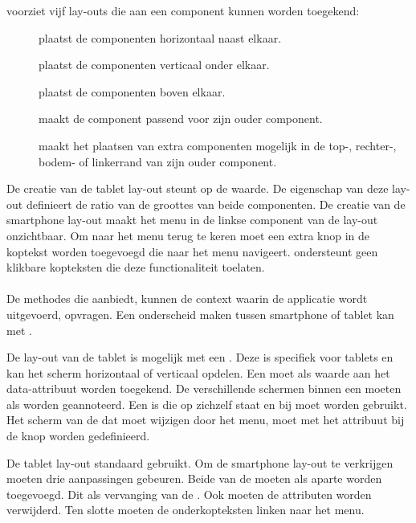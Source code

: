\st{} voorziet vijf lay-outs die aan een component kunnen worden toegekend:
\begin{description}
 \item [] plaatst de componenten horizontaal naast elkaar.
 \item [] plaatst de componenten verticaal onder elkaar.
 \item [] plaatst de componenten boven elkaar.
 \item [] maakt de component passend voor zijn ouder component.
 \item [] maakt het plaatsen van extra componenten mogelijk in de top-, rechter-, bodem- of linkerrand van zijn ouder component.
\end{description}
De creatie van de tablet lay-out steunt op de  waarde.
De  eigenschap van deze lay-out definieert de ratio van de groottes van beide componenten.
De creatie van de smartphone lay-out maakt het menu in de linkse component van de lay-out onzichtbaar.
Om naar het menu terug te keren moet een extra knop in de koptekst worden toegevoegd die naar het menu navigeert.
\st{} ondersteunt geen klikbare kopteksten die deze functionaliteit toelaten.

\paragraph{\kendo}
De methodes die  aanbiedt, kunnen de context waarin de applicatie wordt uitgevoerd, opvragen.
Een onderscheid maken tussen smartphone of tablet kan met .

De lay-out van de tablet is mogelijk met een .
Deze  is specifiek voor tablets en kan het scherm horizontaal of verticaal opdelen.
Een  moet als waarde aan het data-attribuut  worden toegekend.
De verschillende schermen binnen een  moeten als  worden geannoteerd.
Een  is  die op zichzelf staat en bij  moet worden gebruikt.
Het scherm van de  dat moet wijzigen door het menu, moet met het  attribuut bij de knop worden gedefinieerd.

De tablet lay-out standaard gebruikt.
Om de smartphone lay-out te verkrijgen moeten drie aanpassingen gebeuren.
Beide  van de  moeten als aparte  worden toegevoegd.
Dit als vervanging van de .
Ook moeten de  attributen worden verwijderd.
Ten slotte moeten de onderkopteksten linken naar het menu.

